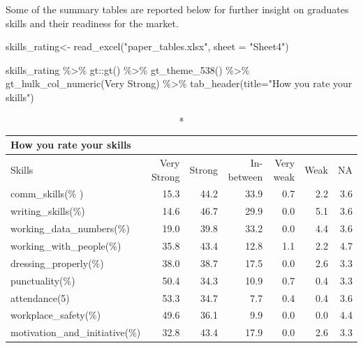 \documentclass[
]{aft}
\newenvironment{Shaded}{\begin{snugshade}}{\end{snugshade}}
\newcommand{\AttributeTok}[1]{\textcolor[rgb]{0.40,0.45,0.13}{#1}}
\newcommand{\FunctionTok}[1]{\textcolor[rgb]{0.28,0.35,0.67}{#1}}
\newcommand{\NormalTok}[1]{\textcolor[rgb]{0.00,0.23,0.31}{#1}}
\newcommand{\OtherTok}[1]{\textcolor[rgb]{0.00,0.23,0.31}{#1}}
\newcommand{\SpecialCharTok}[1]{\textcolor[rgb]{0.37,0.37,0.37}{#1}}
\newcommand{\StringTok}[1]{\textcolor[rgb]{0.13,0.47,0.30}{#1}}
\begin{document}
Some of the summary tables are reported below for further insight on
graduates skills and their readiness for the market.

\begin{Shaded}
\begin{Highlighting}[]
\NormalTok{skills\_rating}\OtherTok{\textless{}{-}} \FunctionTok{read\_excel}\NormalTok{(}\StringTok{"paper\_tables.xlsx"}\NormalTok{,   }\AttributeTok{sheet =} \StringTok{"Sheet4"}\NormalTok{)}

\NormalTok{skills\_rating }\SpecialCharTok{\%\textgreater{}\%}\NormalTok{ gt}\SpecialCharTok{::}\FunctionTok{gt}\NormalTok{() }\SpecialCharTok{\%\textgreater{}\%} 
  \FunctionTok{gt\_theme\_538}\NormalTok{() }\SpecialCharTok{\%\textgreater{}\%}
  \FunctionTok{gt\_hulk\_col\_numeric}\NormalTok{(}\StringTok{\textasciigrave{}}\AttributeTok{Very Strong}\StringTok{\textasciigrave{}}\NormalTok{) }\SpecialCharTok{\%\textgreater{}\%}  \FunctionTok{tab\_header}\NormalTok{(}\AttributeTok{title=}\StringTok{"How you rate your skills"}\NormalTok{)}
\end{Highlighting}
\end{Shaded}

\captionsetup[table]{labelformat=empty,skip=1pt}
\begin{longtable}{lrrrrrr}
\caption*{
{\large How you rate your skills}
} \\ 
\toprule
Skills & Very Strong & Strong & In-between & Very weak & Weak & NA \\ 
\midrule
comm\_skills(\% ) & 15.3 & 44.2 & 33.9 & 0.7 & 2.2 & 3.6 \\ 
writing\_skills(\%) & 14.6 & 46.7 & 29.9 & 0.0 & 5.1 & 3.6 \\ 
working\_data\_numbers(\%) & 19.0 & 39.8 & 33.2 & 0.0 & 4.4 & 3.6 \\ 
working\_with\_people(\%) & 35.8 & 43.4 & 12.8 & 1.1 & 2.2 & 4.7 \\ 
dressing\_properly(\%) & 38.0 & 38.7 & 17.5 & 0.0 & 2.6 & 3.3 \\ 
punctuality(\%) & 50.4 & 34.3 & 10.9 & 0.7 & 0.4 & 3.3 \\ 
attendance(5) & 53.3 & 34.7 & 7.7 & 0.4 & 0.4 & 3.6 \\ 
workplace\_safety(\%) & 49.6 & 36.1 & 9.9 & 0.0 & 0.0 & 4.4 \\ 
motivation\_and\_initiative(\%) & 32.8 & 43.4 & 17.9 & 0.0 & 2.6 & 3.3 \\ 
\bottomrule
\end{longtable}
\end{document}

